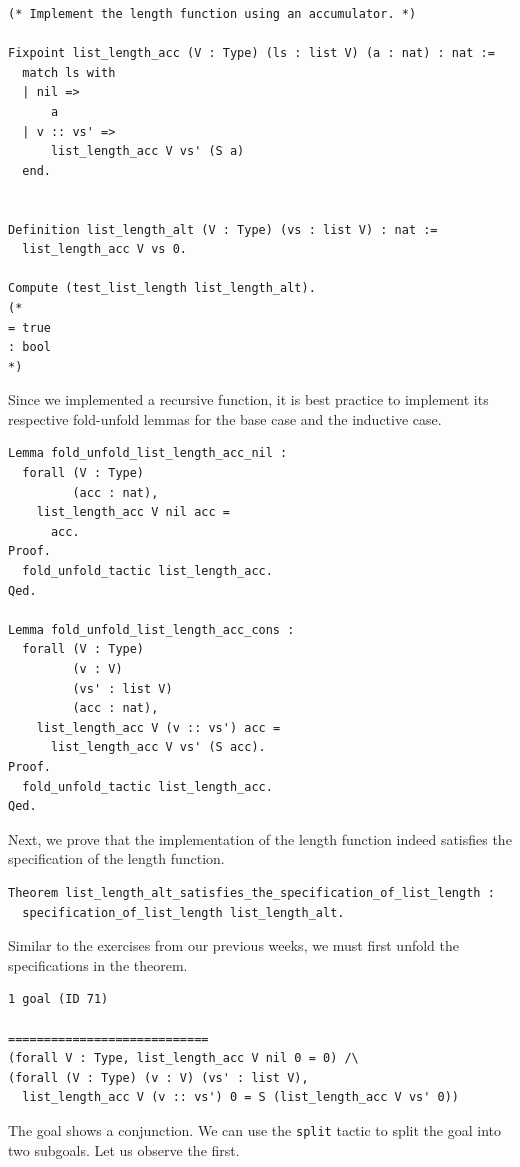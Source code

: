 \documentclass{article}
\begin{document}
\begin{lstlisting}
(* Implement the length function using an accumulator. *)

Fixpoint list_length_acc (V : Type) (ls : list V) (a : nat) : nat :=
  match ls with
  | nil =>
      a
  | v :: vs' =>
      list_length_acc V vs' (S a)
  end.


Definition list_length_alt (V : Type) (vs : list V) : nat :=
  list_length_acc V vs 0.

Compute (test_list_length list_length_alt).
(* 
= true
: bool
*)
\end{lstlisting}

Since we implemented a recursive function, it is best practice to implement its respective fold-unfold lemmas for the base case and the inductive case.

\begin{lstlisting}
Lemma fold_unfold_list_length_acc_nil :
  forall (V : Type)
         (acc : nat),
    list_length_acc V nil acc =
      acc.
Proof.
  fold_unfold_tactic list_length_acc.
Qed.

Lemma fold_unfold_list_length_acc_cons :
  forall (V : Type)
         (v : V)
         (vs' : list V)
         (acc : nat),
    list_length_acc V (v :: vs') acc =
      list_length_acc V vs' (S acc).
Proof.
  fold_unfold_tactic list_length_acc.
Qed.
\end{lstlisting}

Next, we prove that the implementation of the length function indeed satisfies the specification of the length function.

\begin{lstlisting}
Theorem list_length_alt_satisfies_the_specification_of_list_length :
  specification_of_list_length list_length_alt.
\end{lstlisting}

Similar to the exercises from our previous weeks, we must first unfold the specifications in the theorem.

\begin{lstlisting}
1 goal (ID 71)

============================
(forall V : Type, list_length_acc V nil 0 = 0) /\
(forall (V : Type) (v : V) (vs' : list V),
  list_length_acc V (v :: vs') 0 = S (list_length_acc V vs' 0))
\end{lstlisting}

The goal shows a conjunction. We can use the \texttt{split} tactic to split the goal into two subgoals. Let us observe the first.
\end{document}
